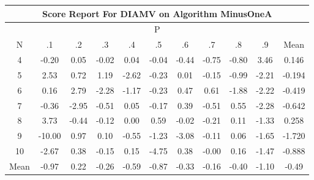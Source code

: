 \documentclass[11pt,a4paper]{report}
\begin{document}
\begin{longtable}{ | c || c | c | c | c | c | c | c | c | c || c |}
\hline
\multicolumn{11}{|c|}{ Score Report For DIAMV on Algorithm MinusOneA} \\
\hline
\multicolumn{11}{|c|}{ P } \\
\hline
N & .1 & .2 & .3 & .4 & .5 & .6 & .7 & .8 & .9 & Mean\\
 \hline
 \hline
 \endhead
  4 &  \cellcolor[HTML]{FFF7F7} -0.20 &  \cellcolor[HTML]{FFFFFF} 0.05 &  \cellcolor[HTML]{FFFFFF} -0.02 &  \cellcolor[HTML]{FFFFFF} 0.04 &  \cellcolor[HTML]{FFFFFF} -0.04 &  \cellcolor[HTML]{FFF7F7} -0.44 &  \cellcolor[HTML]{FFEFEF} -0.75 &  \cellcolor[HTML]{FFE7E7} -0.80 &  \cellcolor[HTML]{A7A7FF} 3.46 & 0.146 \\
  5 &  \cellcolor[HTML]{BFBFFF} 2.53 &  \cellcolor[HTML]{EFEFFF} 0.72 &  \cellcolor[HTML]{DFDFFF} 1.19 &  \cellcolor[HTML]{FFBFBF} -2.62 &  \cellcolor[HTML]{FFF7F7} -0.23 &  \cellcolor[HTML]{FFFFFF} 0.01 &  \cellcolor[HTML]{FFFFFF} -0.15 &  \cellcolor[HTML]{FFE7E7} -0.99 &  \cellcolor[HTML]{FFC7C7} -2.21 & -0.194 \\
  6 &  \cellcolor[HTML]{FFFFFF} 0.16 &  \cellcolor[HTML]{B7B7FF} 2.79 &  \cellcolor[HTML]{FFC7C7} -2.28 &  \cellcolor[HTML]{FFDFDF} -1.17 &  \cellcolor[HTML]{FFF7F7} -0.23 &  \cellcolor[HTML]{F7F7FF} 0.47 &  \cellcolor[HTML]{EFEFFF} 0.61 &  \cellcolor[HTML]{FFCFCF} -1.88 &  \cellcolor[HTML]{FFC7C7} -2.22 & -0.419 \\
  7 &  \cellcolor[HTML]{FFF7F7} -0.36 &  \cellcolor[HTML]{FFB7B7} -2.95 &  \cellcolor[HTML]{FFEFEF} -0.51 &  \cellcolor[HTML]{FFFFFF} 0.05 &  \cellcolor[HTML]{FFF7F7} -0.17 &  \cellcolor[HTML]{F7F7FF} 0.39 &  \cellcolor[HTML]{FFEFEF} -0.51 &  \cellcolor[HTML]{EFEFFF} 0.55 &  \cellcolor[HTML]{FFC7C7} -2.28 & -0.642 \\
  8 &  \cellcolor[HTML]{9F9FFF} 3.73 &  \cellcolor[HTML]{FFF7F7} -0.44 &  \cellcolor[HTML]{FFFFFF} -0.12 &  \cellcolor[HTML]{FFFFFF} 0.00 &  \cellcolor[HTML]{EFEFFF} 0.59 &  \cellcolor[HTML]{FFFFFF} -0.02 &  \cellcolor[HTML]{FFF7F7} -0.21 &  \cellcolor[HTML]{FFFFFF} 0.11 &  \cellcolor[HTML]{FFDFDF} -1.33 & 0.258 \\
  9 &  \cellcolor[HTML]{FF0000} -10.00 &  \cellcolor[HTML]{E7E7FF} 0.97 &  \cellcolor[HTML]{FFFFFF} 0.10 &  \cellcolor[HTML]{FFEFEF} -0.55 &  \cellcolor[HTML]{FFDFDF} -1.23 &  \cellcolor[HTML]{FFAFAF} -3.08 &  \cellcolor[HTML]{FFFFFF} -0.11 &  \cellcolor[HTML]{FFFFFF} 0.06 &  \cellcolor[HTML]{FFD7D7} -1.65 & -1.720 \\
  10 &  \cellcolor[HTML]{FFBFBF} -2.67 &  \cellcolor[HTML]{F7F7FF} 0.38 &  \cellcolor[HTML]{FFFFFF} -0.15 &  \cellcolor[HTML]{FFFFFF} 0.15 &  \cellcolor[HTML]{FF8787} -4.75 &  \cellcolor[HTML]{F7F7FF} 0.38 &  \cellcolor[HTML]{FFFFFF} -0.00 &  \cellcolor[HTML]{F7F7FF} 0.16 &  \cellcolor[HTML]{FFD7D7} -1.47 & -0.888 \\
 \hline
 \hline
Mean &  \cellcolor[HTML]{FFE7E7} -0.97 &  \cellcolor[HTML]{F7F7FF} 0.22 &  \cellcolor[HTML]{FFF7F7} -0.26 &  \cellcolor[HTML]{FFEFEF} -0.59 &  \cellcolor[HTML]{FFE7E7} -0.87 &  \cellcolor[HTML]{FFF7F7} -0.33 &  \cellcolor[HTML]{FFF7F7} -0.16 &  \cellcolor[HTML]{FFF7F7} -0.40 &  \cellcolor[HTML]{FFE7E7} -1.10 &  \cellcolor[HTML]{FFEFEF} -0.49
\end{longtable}
\end{document}
